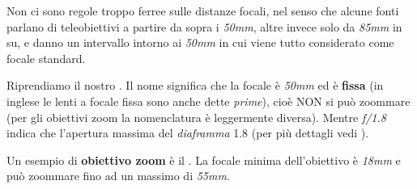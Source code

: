 \nb Non ci sono regole troppo ferree sulle distanze focali, nel senso che alcune fonti parlano di teleobiettivi a partire da sopra i \textit{50mm}, altre invece solo da \textit{85mm} in su, e danno un intervallo intorno ai \textit{50mm} in cui viene tutto considerato come focale standard.

Riprendiamo il nostro .\newline
Il nome significa che la focale è \textit{50mm} ed è \textbf{fissa} (in inglese le lenti a focale fissa sono anche dette \textit{prime}), cioè NON si può zoommare (per gli obiettivi zoom la nomenclatura è leggermente diversa).
Mentre \textit{f/1.8} indica che l'apertura massima del \textit{diaframma} 1.8 (per più dettagli vedi ).

Un esempio di \textbf{obiettivo zoom} è il .\newline
La focale minima dell'obiettivo è \textit{18mm} e può zoommare fino ad un massimo di \textit{55mm}.